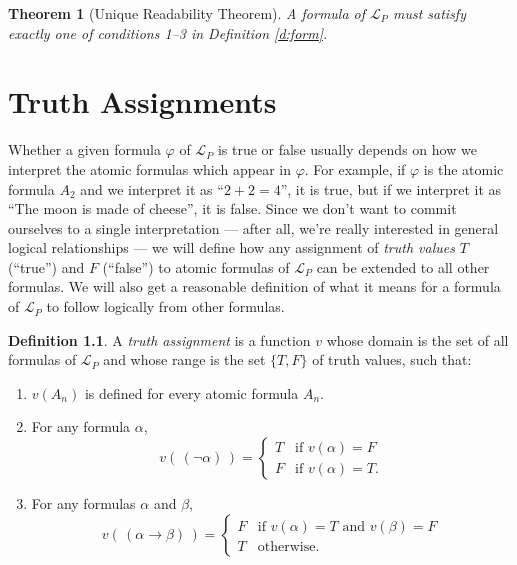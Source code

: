 \documentclass[12pt]{amsbook}
\theoremstyle{plain}
\newtheorem{thm}{Theorem}[chapter]
\theoremstyle{definition}
\newtheorem{defn}{Definition}[chapter]
\theoremstyle{remark}
\begin{document}
\begin{thm}[Unique Readability Theorem] \label{t:ur}   
A formula of $\mathcal{L}_P$ must satisfy exactly one of conditions 1--3 in Definition \ref{d:form}.
\end{thm}


%
%

\chapter{Truth Assignments} \label{ch:two}

Whether a given formula $\varphi$ of $\mathcal{L}_P$ is true or false usually depends on how we interpret the atomic formulas which appear in $\varphi$.  For example,  if $\varphi$ is the atomic formula $A_2$ and we interpret it as ``$2 + 2 = 4$'',  it is true,  but if we interpret it as ``The moon is made of cheese'',  it is false.  Since we don't want to commit ourselves to a single interpretation --- after all,  we're really interested in general logical relationships --- we will define how any assignment of {\em truth values\/} $T$ (``true'') and $F$ (``false'') to atomic formulas of $\mathcal{L}_P$ can be extended to all other formulas.  We will also get a reasonable definition of what it means for a formula of $\mathcal{L}_P$ to follow logically from other formulas.  

\begin{defn} \label{d:tras}  
A {\em truth assignment\/} is a function $v$ whose domain is the set of all formulas of $\mathcal{L}_P$ and whose range is the set $\{ T, F \}$ of truth values,  such that:
\begin{enumerate}
\item $v(A_n)$ is defined for every atomic formula $A_n$.
\item For any formula $\alpha$,
  \begin{displaymath}
    v(\, (\lnot\alpha)\, ) = \begin{cases}
      T & \text{if $v(\alpha) = F$} \\
      F & \text{if $v(\alpha) = T$.}
    \end{cases}
  \end{displaymath}
\item For any formulas $\alpha$ and $\beta$,
  \begin{displaymath}
    v(\, (\alpha \to \beta)\, ) = \begin{cases}
      F & \text{if $v(\alpha)=T$ and $v(\beta)=F$} \\
      T & \text{otherwise.}
    \end{cases}
  \end{displaymath}
\end{enumerate}
\end{defn}
\end{document}
